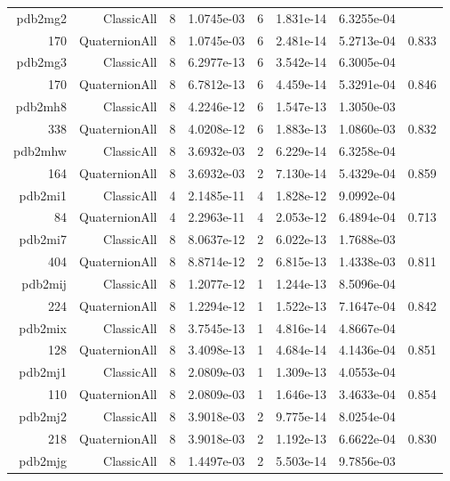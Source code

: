\begin{xltabular}{\textwidth}{r|rcS[table-format=1.4e+2]cS[table-format=1.3e+2]S[table-format=1.4e+2]S[table-format=-1.3]}
pdb2mg2 & ClassicAll & 8 & 1.0745e-03 & 6 & 1.831e-14 & 6.3255e-04 & \\
170 & QuaternionAll & 8 & 1.0745e-03 & 6 & 2.481e-14 & 5.2713e-04 & 0.833\\  \addlinespace
pdb2mg3 & ClassicAll & 8 & 6.2977e-13 & 6 & 3.542e-14 & 6.3005e-04 & \\
170 & QuaternionAll & 8 & 6.7812e-13 & 6 & 4.459e-14 & 5.3291e-04 & 0.846\\  \addlinespace
pdb2mh8 & ClassicAll & 8 & 4.2246e-12 & 6 & 1.547e-13 & 1.3050e-03 & \\
338 & QuaternionAll & 8 & 4.0208e-12 & 6 & 1.883e-13 & 1.0860e-03 & 0.832\\  \addlinespace
pdb2mhw & ClassicAll & 8 & 3.6932e-03 & 2 & 6.229e-14 & 6.3258e-04 & \\
164 & QuaternionAll & 8 & 3.6932e-03 & 2 & 7.130e-14 & 5.4329e-04 & 0.859\\  \addlinespace
pdb2mi1 & ClassicAll & 4 & 2.1485e-11 & 4 & 1.828e-12 & 9.0992e-04 & \\
84 & QuaternionAll & 4 & 2.2963e-11 & 4 & 2.053e-12 & 6.4894e-04 & 0.713\\  \addlinespace
pdb2mi7 & ClassicAll & 8 & 8.0637e-12 & 2 & 6.022e-13 & 1.7688e-03 & \\
404 & QuaternionAll & 8 & 8.8714e-12 & 2 & 6.815e-13 & 1.4338e-03 & 0.811\\  \addlinespace
pdb2mij & ClassicAll & 8 & 1.2077e-12 & 1 & 1.244e-13 & 8.5096e-04 & \\
224 & QuaternionAll & 8 & 1.2294e-12 & 1 & 1.522e-13 & 7.1647e-04 & 0.842\\  \addlinespace
pdb2mix & ClassicAll & 8 & 3.7545e-13 & 1 & 4.816e-14 & 4.8667e-04 & \\
128 & QuaternionAll & 8 & 3.4098e-13 & 1 & 4.684e-14 & 4.1436e-04 & 0.851\\  \addlinespace
pdb2mj1 & ClassicAll & 8 & 2.0809e-03 & 1 & 1.309e-13 & 4.0553e-04 & \\
110 & QuaternionAll & 8 & 2.0809e-03 & 1 & 1.646e-13 & 3.4633e-04 & 0.854\\  \addlinespace
pdb2mj2 & ClassicAll & 8 & 3.9018e-03 & 2 & 9.775e-14 & 8.0254e-04 & \\
218 & QuaternionAll & 8 & 3.9018e-03 & 2 & 1.192e-13 & 6.6622e-04 & 0.830\\  \addlinespace
pdb2mjg & ClassicAll & 8 & 1.4497e-03 & 2 & 5.503e-14 & 9.7856e-03 & \\

\end{xltabular}
